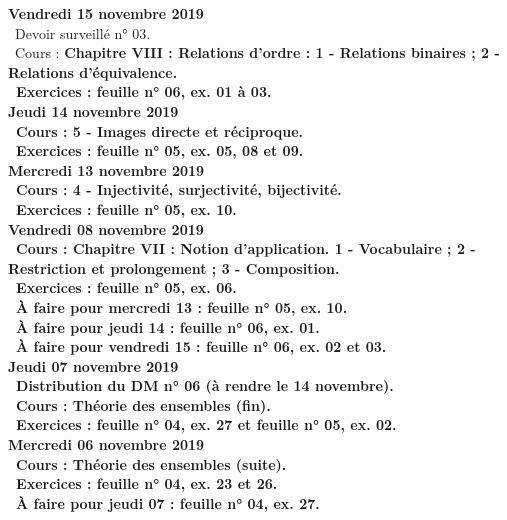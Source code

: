 \documentclass[12pt,a4paper]{article}
\begin{document}
\noindent\textbf{Vendredi 15 novembre 2019}\\
\bu\ Devoir surveillé n° 03.\\
\bu\ Cours : \bf Chapitre VIII \rm : Relations d'ordre : 1 - Relations binaires ; 2 - Relations d'équivalence.\\
\bu\ Exercices : feuille n° 06, ex. 01 à 03.\vspace{.4cm}\\

\noindent\textbf{Jeudi 14 novembre 2019}\\
\bu\ Cours : 5 - Images directe et réciproque.\\
\bu\ Exercices : feuille n° 05, ex. 05, 08 et 09.\vspace{.4cm}\\

\noindent\textbf{Mercredi 13 novembre 2019}\\
\bu\ Cours : 4 - Injectivité, surjectivité, bijectivité.\\
\bu\ Exercices : feuille n° 05, ex. 10.\vspace{.4cm}\\

\noindent\textbf{Vendredi 08 novembre 2019}\\
\bu\ Cours : \bf Chapitre VII \rm : Notion d'application. 1 - Vocabulaire ; 2 - Restriction et prolongement ; 3 - Composition.\\
\bu\ Exercices : feuille n° 05, ex. 06.\\
\bu\ À faire pour mercredi 13 : feuille n° 05, ex. 10.\\
\bu\ À faire pour jeudi 14 : feuille n° 06, ex. 01.\\
\bu\ À faire pour vendredi 15 : feuille n° 06, ex. 02 et 03.\vspace{.4cm}\\

\noindent\textbf{Jeudi 07 novembre 2019}\\
\bu\ Distribution du DM n° 06 (à rendre le 14 novembre).\\
\bu\ Cours : Théorie des ensembles (fin).\\
\bu\ Exercices : feuille n° 04, ex. 27 et feuille n° 05, ex. 02.\vspace{.4cm}\\

\noindent\textbf{\bf Mercredi 06 novembre 2019}\\
\bu\ Cours : Théorie des ensembles (suite).\\
\bu\ Exercices : feuille n° 04, ex. 23 et 26.\\
\bu\ À faire pour jeudi 07 : feuille n° 04, ex. 27.\vspace{.4cm}\\
 
\end{document}

